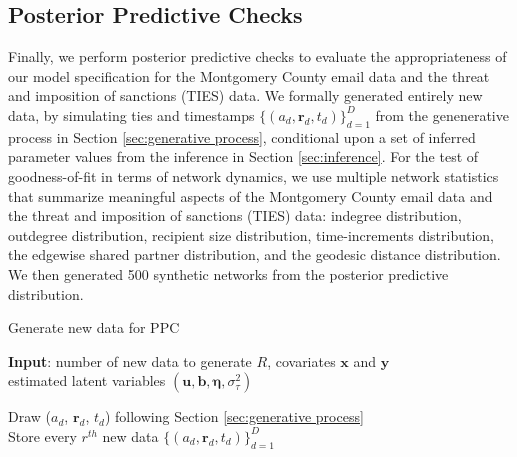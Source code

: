 \documentclass[12pt]{article}
\begin{document}
\subsection{Posterior Predictive Checks}\label{subsubsec:PPC_email} 	   
Finally, we perform posterior predictive checks \cite{rubin1984bayesianly} to evaluate the appropriateness of our model specification for the Montgomery County email data and the threat and imposition of sanctions (TIES) data. We formally generated entirely new data, by simulating ties and timestamps $\{(a_{d}, \boldsymbol{r}_{d}, t_{d})\}_{d=1}^D$ from the genenerative process in Section \ref{sec:generative process}, conditional upon a set of inferred parameter values from the inference in Section \ref{sec:inference}. For the test of goodness-of-fit in terms of network dynamics, we use multiple network statistics that summarize meaningful aspects of the Montgomery County email data and the threat and imposition of sanctions (TIES) data: indegree distribution, outdegree distribution, recipient size distribution, time-increments distribution, the edgewise shared partner distribution, and the geodesic distance distribution. We then generated 500 synthetic networks from the posterior predictive distribution.
\begin{algorithm}[H]
	\caption{Generate new data for PPC}
	\begin{algorithmic}
		\STATE \textbf{Input}: number of new data to generate $R$, covariates $\boldsymbol{x}$ and $\boldsymbol{y}$\\
		estimated latent variables $(\boldsymbol{u}, \boldsymbol{b}, \boldsymbol{\eta},  \sigma_\tau^2)$\\
		\vskip 0.1in
		
		\STATE	Draw ($a_{d}$, $\boldsymbol{r}_{d}$, $t_{d}$) following Section \ref{sec:generative process}\\
		\ENDFOR
		\STATE Store every $r^{th}$ new data $\{(a_{d}, \boldsymbol{r}_{d}, t_{d})\}_{d=1}^D$ 
		\ENDFOR
	\end{algorithmic}
\end{algorithm}       
\end{document}
